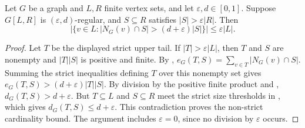 \begin{lemma}
Let $G$ be a graph and $L,R$ finite vertex sets, and let $\varepsilon,d\in[0,1]$.
Suppose $G[L,R]$ is $(\varepsilon,d)$-regular, and $S\subseteq R$ satisfies $|S|>\varepsilon|R|$.
Then
\[
 |\{v\in L:|N_G(v)\cap S|>(d+\varepsilon)|S|\}|\leq\varepsilon|L|.
\]
\end{lemma}
\begin{proof}
Let $T$ be the displayed strict upper tail. If $|T|>\varepsilon|L|$, then $T$ and $S$ are nonempty and $|T||S|$ is positive and finite.
By , $e_G(T,S)=\sum_{v\in T}|N_G(v)\cap S|$.
Summing the strict inequalities defining $T$ over this nonempty set gives
$e_G(T,S)>(d+\varepsilon)|T||S|$.
By division by the positive finite product and , $d_G(T,S)>d+\varepsilon$.
But $T\subseteq L$ and $S\subseteq R$ meet the strict size thresholds in , which gives $d_G(T,S)\leq d+\varepsilon$.
This contradiction proves the non-strict cardinality bound.
The argument includes $\varepsilon=0$, since no division by $\varepsilon$ occurs.
\end{proof}
